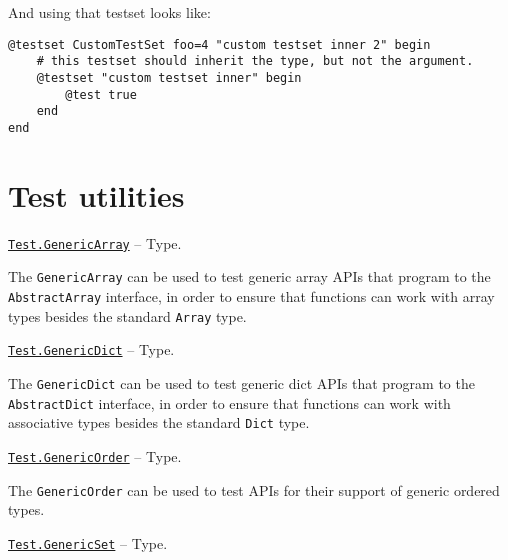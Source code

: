 And using that testset looks like:




\begin{verbatim}
@testset CustomTestSet foo=4 "custom testset inner 2" begin
    # this testset should inherit the type, but not the argument.
    @testset "custom testset inner" begin
        @test true
    end
end
\end{verbatim}



\hypertarget{4459314886765454190}{}


\section{Test utilities}


\hypertarget{10822722170202396815}{}
\hyperlink{10822722170202396815}{\texttt{Test.GenericArray}}  -- {Type.}

\begin{adjustwidth}{2em}{0pt}

The \texttt{GenericArray} can be used to test generic array APIs that program to the \texttt{AbstractArray} interface, in order to ensure that functions can work with array types besides the standard \texttt{Array} type.



\end{adjustwidth}
\hypertarget{804391048718774709}{}
\hyperlink{804391048718774709}{\texttt{Test.GenericDict}}  -- {Type.}

\begin{adjustwidth}{2em}{0pt}

The \texttt{GenericDict} can be used to test generic dict APIs that program to the \texttt{AbstractDict} interface, in order to ensure that functions can work with associative types besides the standard \texttt{Dict} type.



\end{adjustwidth}
\hypertarget{13070408586495522667}{}
\hyperlink{13070408586495522667}{\texttt{Test.GenericOrder}}  -- {Type.}

\begin{adjustwidth}{2em}{0pt}

The \texttt{GenericOrder} can be used to test APIs for their support of generic ordered types.



\end{adjustwidth}
\hypertarget{8446774931265752878}{}
\hyperlink{8446774931265752878}{\texttt{Test.GenericSet}}  -- {Type.}

